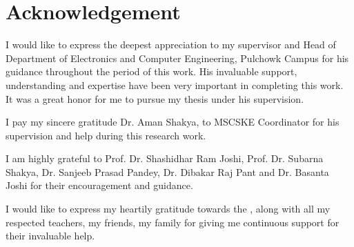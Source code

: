 \chapter*{Acknowledgement}


I would like to express the deepest appreciation to my supervisor and Head of Department of Electronics and Computer Engineering, Pulchowk Campus \myadvisorA for his guidance throughout the period of this work. His invaluable support, understanding and expertise have been very important in completing this work. It was a great honor for me to pursue my thesis under his supervision.

I pay my sincere gratitude Dr. Aman Shakya, to MSCSKE Coordinator for his supervision and help during this research work.

I am highly grateful to Prof. Dr. Shashidhar Ram Joshi, Prof. Dr. Subarna Shakya, Dr. Sanjeeb Prasad Pandey, Dr. Dibakar Raj Pant and Dr. Basanta Joshi for their encouragement and guidance.

I would like to express my heartily gratitude towards the \myinstitute, \mycampus along with all my respected teachers, my friends, my family for giving me continuous support for their invaluable help.


{\bf{\theauthor}}


{\bf{\roll}}


{\bf{\myinstitute}}


